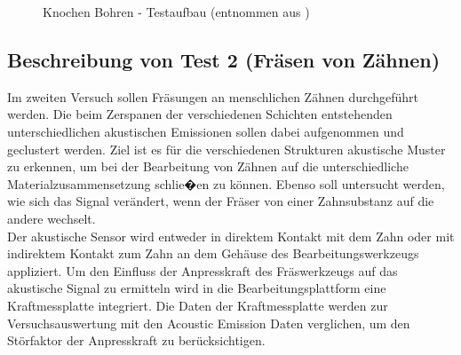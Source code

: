 \documentclass[twoside, 12pt, a4paper]{article}
\begin{document}
	
	
		\begin{figure}[!htbp]
		\centering
		\setlength{\fboxsep}{0.5pt}
		\setlength{\fboxrule}{0.5pt}
		\caption[Knochen Bohren]{Knochen Bohren - Testaufbau (entnommen aus \cite[S. 6]{Dentsply.21.04.2020})}
		\label{img:Knochen Bohren}
	\end{figure}
	\FloatBarrier
	
\subsection{Beschreibung von Test 2 (Fr\"asen von Z\"ahnen)}	

Im zweiten Versuch sollen Fr\"asungen an menschlichen Z\"ahnen durchgef\"uhrt werden. Die beim Zerspanen der verschiedenen Schichten entstehenden unterschiedlichen akustischen Emissionen sollen dabei aufgenommen und geclustert werden. Ziel ist es f\"ur die verschiedenen Strukturen akustische Muster zu erkennen, um bei der Bearbeitung von Z\"ahnen auf die unterschiedliche Materialzusammensetzung schlie�en zu k\"onnen. Ebenso soll untersucht werden, wie sich das Signal ver\"andert, wenn der Fr\"aser von einer Zahnsubstanz auf die andere wechselt.\\
Der akustische Sensor wird entweder in direktem Kontakt mit dem Zahn oder mit indirektem Kontakt zum Zahn an dem Geh\"ause des Bearbeitungswerkzeugs appliziert. Um den Einfluss der Anpresskraft des Fr\"aswerkzeugs auf das akustische Signal zu ermitteln wird in die Bearbeitungsplattform eine Kraftmessplatte integriert. Die Daten der Kraftmessplatte werden zur Versuchsauswertung mit den Acoustic Emission Daten verglichen, um den St\"orfaktor der Anpresskraft zu ber\"ucksichtigen.
\end{document}
